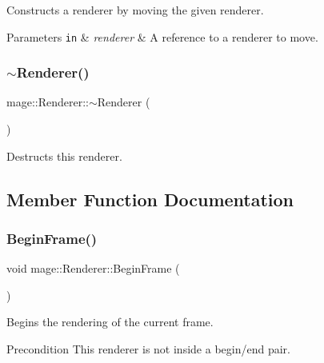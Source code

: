 Constructs a renderer by moving the given renderer.


\begin{DoxyParams}[1]{Parameters}
\mbox{\tt in}  & {\em renderer} & A reference to a renderer to move. \\
\hline
\end{DoxyParams}
\hypertarget{classmage_1_1_renderer_a997e041f28cc71d069d1ab7d29fe6ced}{}\label{classmage_1_1_renderer_a997e041f28cc71d069d1ab7d29fe6ced} 
\subsubsection{\texorpdfstring{$\sim$\+Renderer()}{~Renderer()}}
{\footnotesize\ttfamily mage\+::\+Renderer\+::$\sim$\+Renderer (\begin{DoxyParamCaption}{ }\end{DoxyParamCaption})}

Destructs this renderer. 

\subsection{Member Function Documentation}
\hypertarget{classmage_1_1_renderer_a3eadaa4b37cd9ad9a3da9f72879b0722}{}\label{classmage_1_1_renderer_a3eadaa4b37cd9ad9a3da9f72879b0722} 
\subsubsection{\texorpdfstring{Begin\+Frame()}{BeginFrame()}}
{\footnotesize\ttfamily void mage\+::\+Renderer\+::\+Begin\+Frame (\begin{DoxyParamCaption}{ }\end{DoxyParamCaption})\hspace{0.3cm}{\ttfamily [noexcept]}}

Begins the rendering of the current frame.

\begin{DoxyPrecond}{Precondition}
This renderer is not inside a begin/end pair. 
\end{DoxyPrecond}
\hypertarget{classmage_1_1_renderer_a97b7b1563939688072fa94341d29cc2c}{}\label{classmage_1_1_renderer_a97b7b1563939688072fa94341d29cc2c} 
